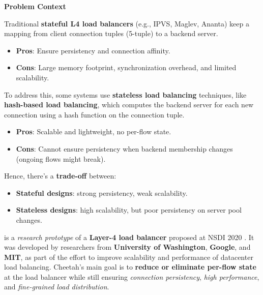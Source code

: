 \highspace
\begin{flushleft}
    \textcolor{Red2}{ \textbf{Problem Context}}
\end{flushleft}
Traditional \textbf{stateful L4 load balancers} (e.g., IPVS, Maglev, Ananta) keep a mapping from client connection tuples (5-tuple) to a backend server.
\begin{itemize}
    \item[\textcolor{Green3}{\faIcon{check}}] \textcolor{Green3}{\textbf{Pros}}: Ensure persistency and connection affinity.
    \item[\textcolor{Red2}{\faIcon{times}}] \textcolor{Red2}{\textbf{Cons}}: Large memory footprint, synchronization overhead, and limited scalability.
\end{itemize}
To address this, some systems use \textbf{stateless load balancing} techniques, like \textbf{hash-based load balancing}, which computes the backend server for each new connection using a hash function on the connection tuple.
\begin{itemize}
    \item[\textcolor{Green3}{\faIcon{check}}] \textcolor{Green3}{\textbf{Pros}}: Scalable and lightweight, no per-flow state.
    \item[\textcolor{Red2}{\faIcon{times}}] \textcolor{Red2}{\textbf{Cons}}: Cannot ensure persistency when backend membership changes (ongoing flows might break).
\end{itemize}
Hence, there's a \textbf{trade-off} between:
\begin{itemize}
    \item \textbf{Stateful designs}: strong persistency, weak scalability.
    \item \textbf{Stateless designs}: high scalability, but poor persistency on server pool changes.
\end{itemize}

\newpage

\begin{flushleft}
\end{flushleft}
 is a \emph{research prototype} of a \textbf{Layer-4 load balancer} proposed at NSDI 2020 \cite{barbette2020high}. It was developed by researchers from \textbf{University of Washington}, \textbf{Google}, and \textbf{MIT}, as part of the effort to improve scalability and performance of datacenter load balancing. Cheetah's main goal is to \textbf{reduce or eliminate per-flow state} at the load balancer while still ensuring \emph{connection persistency}, \emph{high performance}, and \emph{fine-grained load distribution}.

